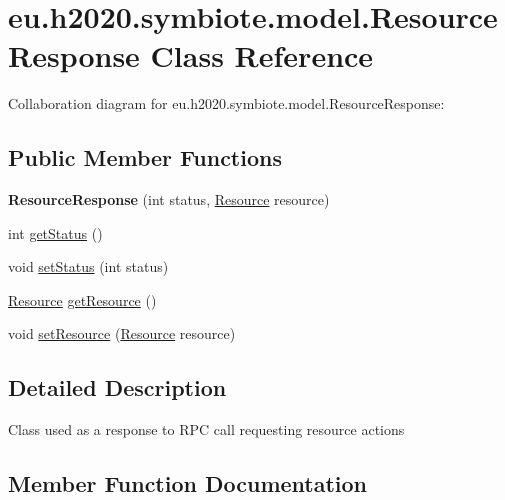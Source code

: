\hypertarget{classeu_1_1h2020_1_1symbiote_1_1model_1_1ResourceResponse}{}\section{eu.\+h2020.\+symbiote.\+model.\+Resource\+Response Class Reference}
\label{classeu_1_1h2020_1_1symbiote_1_1model_1_1ResourceResponse}


Collaboration diagram for eu.\+h2020.\+symbiote.\+model.\+Resource\+Response\+:
\subsection*{Public Member Functions}
\begin{DoxyCompactItemize}
\item 
{\bfseries Resource\+Response} (int status, \hyperlink{classeu_1_1h2020_1_1symbiote_1_1model_1_1Resource}{Resource} resource)\hypertarget{classeu_1_1h2020_1_1symbiote_1_1model_1_1ResourceResponse_ad0141ca2e9efa0c7e25e40fcf62a476e}{}\label{classeu_1_1h2020_1_1symbiote_1_1model_1_1ResourceResponse_ad0141ca2e9efa0c7e25e40fcf62a476e}

\item 
int \hyperlink{classeu_1_1h2020_1_1symbiote_1_1model_1_1ResourceResponse_a291fd5f67222ea0f011793defaab2683}{get\+Status} ()
\item 
void \hyperlink{classeu_1_1h2020_1_1symbiote_1_1model_1_1ResourceResponse_ae7de4f16857ef5c7ed1d272684d2aa8d}{set\+Status} (int status)
\item 
\hyperlink{classeu_1_1h2020_1_1symbiote_1_1model_1_1Resource}{Resource} \hyperlink{classeu_1_1h2020_1_1symbiote_1_1model_1_1ResourceResponse_ac366edd9f5b18a37ad1f1935e5cc60f5}{get\+Resource} ()
\item 
void \hyperlink{classeu_1_1h2020_1_1symbiote_1_1model_1_1ResourceResponse_a65d8ae38a592038757a450b0e3bfe52b}{set\+Resource} (\hyperlink{classeu_1_1h2020_1_1symbiote_1_1model_1_1Resource}{Resource} resource)
\end{DoxyCompactItemize}


\subsection{Detailed Description}
Class used as a response to R\+PC call requesting resource actions 

\subsection{Member Function Documentation}

